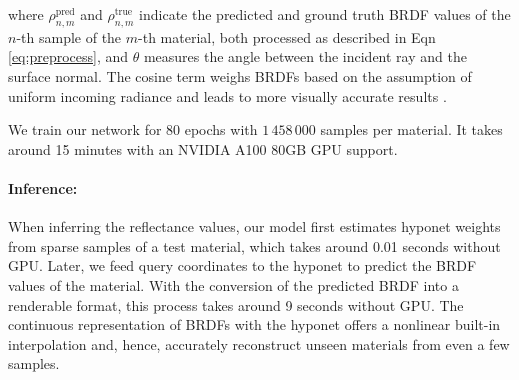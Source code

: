 where $\rho^{\text{pred}}_{n, m}$ and $\rho^{\text{true}}_{n, m}$ indicate the predicted and ground truth BRDF values of the $n$-th sample of the $m$-th material, both processed as described in Eqn \ref{eq:preprocess}, and $\theta$ measures the angle between the incident ray and the surface normal. The cosine term weighs BRDFs based on the assumption of uniform incoming radiance and leads to more visually accurate results \cite{ngan2005experimental}.


We train our network for 80 epochs with $1\,458\,000$ samples per material. It takes around 15 minutes with an NVIDIA A100 80GB GPU support. 


\paragraph{Inference:}
When inferring the reflectance values, our model first estimates hyponet weights from sparse samples of a test material, which takes around 0.01 seconds without GPU. Later, we feed query coordinates to the hyponet to predict the BRDF values of the material. With the conversion of the predicted BRDF into a renderable format, this process takes around 9 seconds without GPU. The continuous representation of BRDFs with the hyponet offers a nonlinear built-in interpolation and, hence, accurately reconstruct unseen materials from even a few samples.
